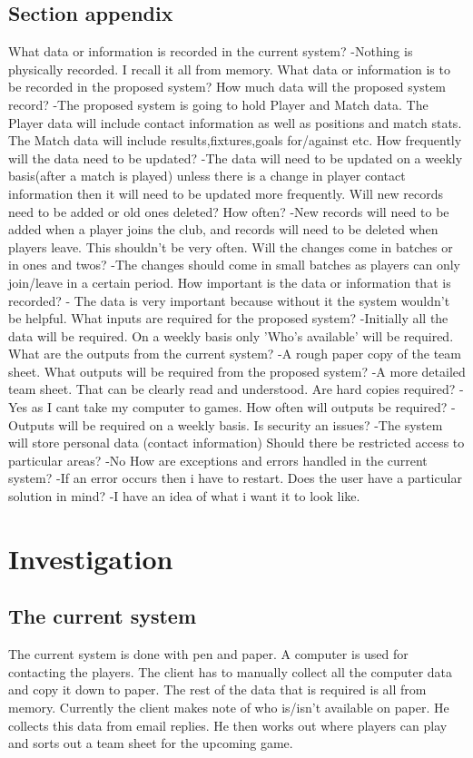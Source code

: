 \subsection{Section appendix}
What data or information is recorded in the current system?
-Nothing is physically recorded. I recall it all from memory.
What data or information is to be recorded in the proposed system? How much data will the proposed system record?
-The proposed system is going to hold Player and Match data. The Player data will include contact information as well as positions and match stats. The Match data will include results,fixtures,goals for/against etc.
How frequently will the data need to be updated?
-The data will need to be updated on a weekly basis(after a match is played) unless there is a change in player contact information then it will need to be updated more frequently. 
Will new records need to be added or old ones deleted? How often?
-New records will need to be added when a player joins the club, and records will need to be deleted when players leave. This shouldn't be very often.
Will the changes come in batches or in ones and twos?
-The changes should come in small batches as players can only join/leave in a certain period.
How important is the data or information that is recorded?
- The data is very important because without it the system wouldn't be helpful. 
What inputs are required for the proposed system?
-Initially all the data will be required. On a weekly basis only 'Who's available' will be required.
What are the outputs from the current system?
-A rough paper copy of the team sheet. 
What outputs will be required from the proposed system?
-A more detailed team sheet. That can be clearly read and understood.
Are hard copies required?
-Yes as I cant take my computer to games. 
How often will outputs be required?
-Outputs will be required on a weekly basis.
Is security an issues?
-The system will store personal data (contact information)
Should there be restricted access to particular areas?
-No
How are exceptions and errors handled in the current system?
-If an error occurs then i have to restart. 
Does the user have a particular solution in mind?
-I have an idea of what i want it to look like. 
\section{Investigation}

\subsection{The current system}
The current system is done with pen and paper. A computer is used for contacting the players. The client has to manually collect all the computer data and copy it down to paper. The rest of the data that is required is all from memory. Currently the client makes note of who is/isn't available on paper. He collects this data from email replies.  He then works out where players can play and sorts out a team sheet for the upcoming game.
